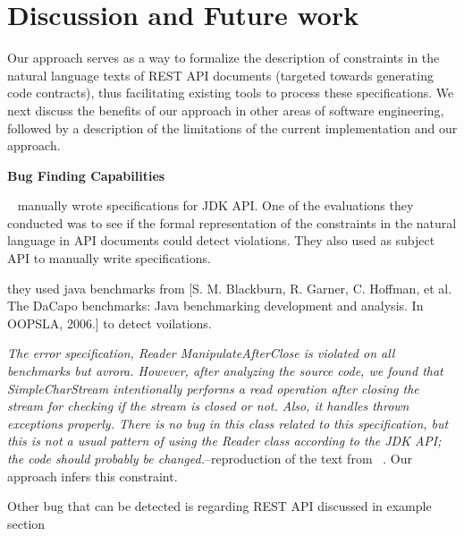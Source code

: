\section{Discussion and Future work}
\label{sec:discussion}

Our approach serves as a way to formalize the description of constraints in the natural language texts of REST API documents (targeted towards generating code contracts), thus facilitating existing tools to process these specifications. We next discuss the benefits of our approach in other areas of software engineering, followed by a description of the limitations of the current implementation and our approach.

\textbf{Bug Finding Capabilities}



~\cite{lee2012towards} manually wrote specifications for JDK API. One of the evaluations they conducted was to see if the formal representation of the constraints in the natural language in API documents could detect violations. They also used  as subject API to manually write specifications. 

they used java benchmarks from [S. M. Blackburn, R. Garner, C. Hoffman, et al. The DaCapo benchmarks: Java benchmarking development and analysis. In OOPSLA, 2006.] to detect voilations.

\textit{The error specification, Reader ManipulateAfterClose is violated on all benchmarks but avrora. However, after analyzing the source code, we found that SimpleCharStream intentionally performs a read operation after closing the stream for checking if the stream is closed or not. Also, it handles thrown exceptions properly. There is no bug in this class related to this specification, but this is not a usual pattern of using the Reader class according to the JDK API; the code should probably be changed.}--reproduction of the text from ~\cite{lee2012towards}. Our approach infers this constraint.

Other bug that can be detected is regarding REST API discussed in example section


%
%
%
%


